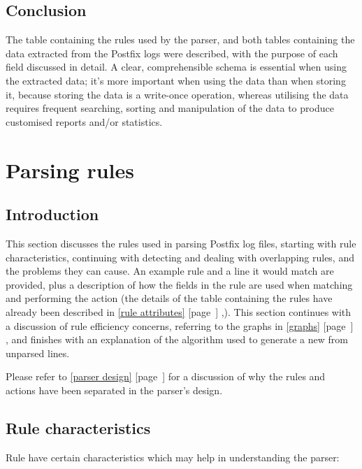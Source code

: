 \documentclass[a4paper,12pt,draft]{article}
\newcommand{\refwithpage}[1]{%
    \empty{}\ref{#1} [page~\pageref{#1}]%
}
\newcommand{\sectionref}[1]{%
    \textsection{}\refwithpage{#1}%
}
\begin{document}
\subsection{Conclusion}

The table containing the rules used by the parser, and both tables
containing the data extracted from the Postfix logs were described, with
the purpose of each field discussed in detail.  A clear, comprehensible
schema is essential when using the extracted data; it's more important when
using the data than when storing it, because storing the data is a
write-once operation, whereas utilising the data requires frequent
searching, sorting and manipulation of the data to produce customised
reports and/or statistics.

\section{Parsing rules}

\label{rules}

\subsection{Introduction}

This section discusses the rules used in parsing Postfix log files,
starting with rule characteristics, continuing with detecting and dealing
with overlapping rules, and the problems they can cause.  An example rule
and a line it would match are provided, plus a description of how the
fields in the rule are used when matching and performing the action (the
details of the table containing the rules have already been described in
\sectionref{rule attributes},).  This section continues with a discussion
of rule efficiency concerns, referring to the graphs in
\sectionref{graphs}, and finishes with an explanation of the algorithm used
to generate a new \regex{} from unparsed lines.

Please refer to \sectionref{parser design} for a discussion of why the
rules and actions have been separated in the parser's design.

\subsection{Rule characteristics}

\label{rule characteristics}


Rule have certain characteristics which may help in understanding the
parser:
\end{document}
